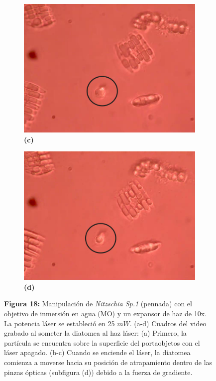 \documentclass[10pt,aspectratio=1610,compress,dvipsnames]{beamer}
\begin{document}
\begin{frame}
{\begin{figure}
  \begin{subfigure}[b]{0.2\linewidth}
    \includegraphics[width=\linewidth]{ResultadosAlgea1/3.png} %
    \caption*{\textbf{(c)}}
    \label{fig7:c}
  \end{subfigure}\hspace{0.5cm} %
  \begin{subfigure}[b]{0.2\linewidth}
    \includegraphics[width=\linewidth]{ResultadosAlgea1/1.png} %
    \caption*{\textbf{(d)}}
    \label{fig7:d}
  \end{subfigure}
   \captionsetup{labelformat = empty}
  \caption{\textbf{Figura 18:} 
Manipulación de \textit{Nitzschia Sp.1} (pennada) con el objetivo de inmersión en agua (MO) y un expansor de haz de 10x. La potencia láser se estableció en 25 $mW$. (a-d) Cuadros del video grabado al someter la diatomea al haz láser: (a) Primero, la partícula se encuentra sobre la superficie del portaobjetos con el láser apagado. (b-c) Cuando se enciende el láser, la diatomea comienza a moverse hacia su posición de atrapamiento dentro de las pinzas ópticas (subfigura (d)) debido a la fuerza de gradiente. }
  \label{poresfrustrules}
\end{figure}


}
\end{frame}
\end{document}
